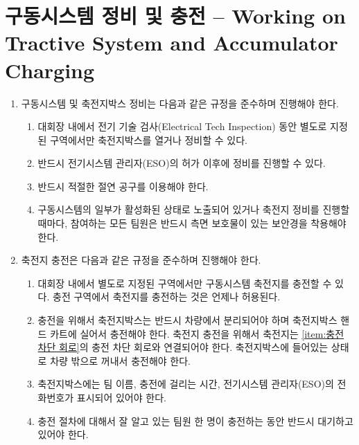 \documentclass[final,a4paper,10pt]{report}
\begin{document}
\section{구동시스템 정비 및 충전 – Working on Tractive System and Accumulator Charging}
\begin{enumerate}
  \item 구동시스템 및 축전지박스 정비는 다음과 같은 규정을 준수하며 진행해야 한다.
    \begin{enumerate}
      \item 대회장 내에서 전기 기술 검사(Electrical Tech Inspection) 동안 별도로 지정된 구역에서만 축전지박스를 열거나 정비할 수 있다.
      \item 반드시 전기시스템 관리자(ESO)의 허가 이후에 정비를 진행할 수 있다.
      \item 반드시 적절한 절연 공구를 이용해야 한다.
      \item 구동시스템의 일부가 활성화된 상태로 노출되어 있거나 축전지 정비를 진행할 때마다, 참여하는 모든 팀원은 반드시 측면 보호물이 있는 보안경을 착용해야 한다.
    \end{enumerate}
    
  \item 축전지 충전은 다음과 같은 규정을 준수하며 진행해야 한다.
    \begin{enumerate}
      \item 대회장 내에서 별도로 지정된 구역에서만 구동시스템 축전지를 충전할 수 있다. 충전 구역에서 축전지를 충전하는 것은 언제나 허용된다.
      \item 충전을 위해서 축전지박스는 반드시 차량에서 분리되어야 하며 축전지박스 핸드 카트에 실어서 충전해야 한다. 축전지 충전을 위해서 축전지는 \cref{item:충전 차단 회로}의 충전 차단 회로와 연결되어야 한다. 축전지박스에 들어있는 상태로 차량 밖으로 꺼내서 충전해야 한다.
      \item 축전지박스에는 팀 이름, 충전에 걸리는 시간, 전기시스템 관리자(ESO)의 전화번호가 표시되어 있어야 한다.
      \item 충전 절차에 대해서 잘 알고 있는 팀원 한 명이 충전하는 동안 반드시 대기하고 있어야 한다.
    \end{enumerate}
    

\end{enumerate}
\end{document}
